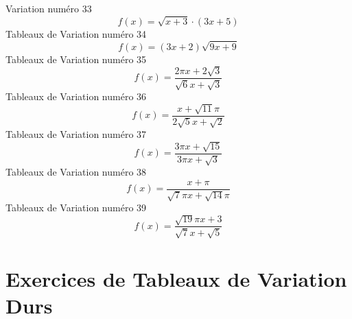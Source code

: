 \documentclass{article}
\begin{document}
Variation num\'ero 33 \[f(x) = \sqrt{x + 3} \cdot \left(3 x + 5\right)\]Tableaux de Variation num\'ero 34 \[f(x) = \left(3 x + 2\right) \sqrt{9 x + 9}\]Tableaux de Variation num\'ero 35 \[f(x) = \frac{2 \pi x + 2 \sqrt{3}}{\sqrt{6} x + \sqrt{3}}\]Tableaux de Variation num\'ero 36 \[f(x) = \frac{x + \sqrt{11} \pi}{2 \sqrt{5} x + \sqrt{2}}\]Tableaux de Variation num\'ero 37 \[f(x) = \frac{3 \pi x + \sqrt{15}}{3 \pi x + \sqrt{3}}\]Tableaux de Variation num\'ero 38 \[f(x) = \frac{x + \pi}{\sqrt{7} \pi x + \sqrt{14} \pi}\]Tableaux de Variation num\'ero 39 \[f(x) = \frac{\sqrt{19} \pi x + 3}{\sqrt{7} x + \sqrt{5}}\]
 \section{Exercices de Tableaux de Variation Durs}
\end{document}
